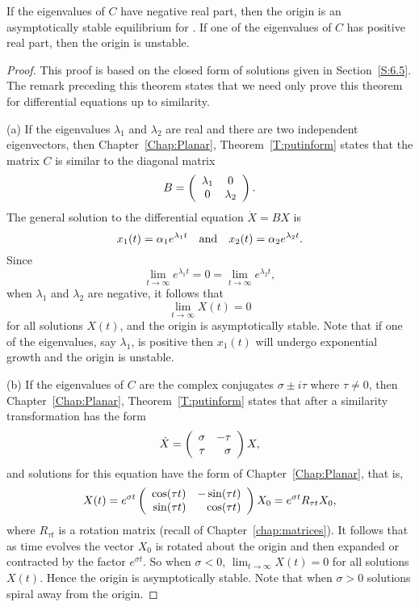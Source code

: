 \documentclass{ximera}
\begin{document}
\begin{theorem}  \label{C:asympstlin}
If the eigenvalues of $C$ have negative real part, then the origin
is an asymptotically stable equilibrium for .
If one of the
eigenvalues of $C$ has positive real part, then the origin is unstable.
\end{theorem}

\begin{proof}  This proof is based on the closed form of solutions given in
Section~\ref{S:6.5}.   The remark preceding this theorem states that we
need only prove this theorem for differential equations up to similarity.

\noindent (a) \quad If the eigenvalues $\lambda_1$ and $\lambda_2$ are real
and there are two independent eigenvectors, then Chapter~\ref{Chap:Planar},
Theorem~\ref{T:putinform} states that the matrix $C$ is similar to the
diagonal matrix
\[
B = \left(\begin{array}{cc} \lambda_1 & 0\\ 0 &\lambda_2\end{array}\right).
\]
The general solution to the differential equation $\dot{X}=BX$ is
\[
x_1(t) = \alpha_1e^{\lambda_1 t} \quad\mbox{and}\quad x_2(t) = \alpha_2e^{\lambda_2 t}.
\]
Since
\[
\lim_{t\to\infty}e^{\lambda_1 t} = 0  = \lim_{t\to\infty}e^{\lambda_2 t},
\]
when $\lambda_1$ and $\lambda_2$ are negative, it follows that
\[
\lim_{t\to\infty} X(t) = 0
\]
for all solutions $X(t)$, and the origin is asymptotically stable.  Note that
if one of the eigenvalues, say $\lambda_1$, is positive then $x_1(t)$ will
undergo exponential growth and the origin is unstable.

\noindent (b) \quad If the eigenvalues of $C$ are the complex conjugates
$\sigma\pm i\tau$ where $\tau\neq 0$, then Chapter~\ref{Chap:Planar},
Theorem~\ref{T:putinform} states that after a similarity transformation
 has the form
\[
\dot{X} = \left(\begin{array}{rr} \sigma & -\tau\\ \tau &\sigma\end{array}\right)X,
\]
and solutions for this equation have the form  of
Chapter~\ref{Chap:Planar}, that is,
\[
X(t) = e^{\sigma t}
\left(\begin{array}{rr} \cos(\tau t) & -\sin(\tau t)\\ \sin(\tau t) &\cos(\tau t)\end{array}\right)X_0
= e^{\sigma t}R_{\tau t}X_0,
\]
where $R_{\tau t}$ is a rotation matrix
(recall  of
Chapter~\ref{chap:matrices}).  It follows that as time evolves
the vector $X_0$ is rotated about the origin and then expanded or contracted
by the factor $e^{\sigma t}$.  So when $\sigma<0$, $\lim_{t\to\infty} X(t)=0$
for all solutions $X(t)$.  Hence the origin is asymptotically stable.  Note
that when $\sigma>0$ solutions spiral away from the origin.


\end{proof}
\end{document}
